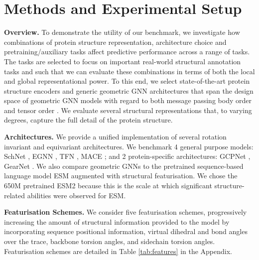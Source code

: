 \section{Methods and Experimental Setup}

\textbf{Overview. }
To demonstrate the utility of our benchmark, we investigate how combinations of protein structure representation, architecture choice and pretraining/auxiliary tasks affect predictive performance across a range of tasks. The tasks are selected to focus on important real-world structural annotation tasks and such that we can evaluate these combinations in terms of both the local and global representational power. To this end, we select state-of-the-art protein structure encoders and generic geometric GNN architectures that span the design space of geometric GNN models with regard to both message passing body order and tensor order \citep{joshi2023expressive}. 
We evaluate several structural representations that, to varying degrees, capture the full detail of the protein structure.

\textbf{Architectures. }
We provide a unified implementation of several rotation invariant and equivariant architectures. 
We benchmark 4 general purpose models: SchNet \citep{schutt2018schnet}, EGNN \citep{satorras2021n}, TFN \citep{thomas2018tensor}, MACE \citep{batatia2022mace}; and 2 protein-specific architectures: GCPNet \citep{morehead2024geometry}, GearNet \citep{zhang2023protein}.
We also compare geometric GNNs to the pretrained sequence-based language model ESM \citep{lin2022language} augmented with structural featurisation.
We chose the 650M pretrained ESM2 because this is the scale at which significant structure-related abilities were observed for ESM.

\textbf{Featurisation Schemes. } We consider five featurisation schemes, progressively increasing the amount of structural information provided to the model by incorporating sequence positional information, virtual dihedral and bond angles over the
\caa 
trace, backbone torsion angles, and sidechain torsion angles. Featurisation schemes are detailed in Table \ref{tab:features} in the Appendix.

